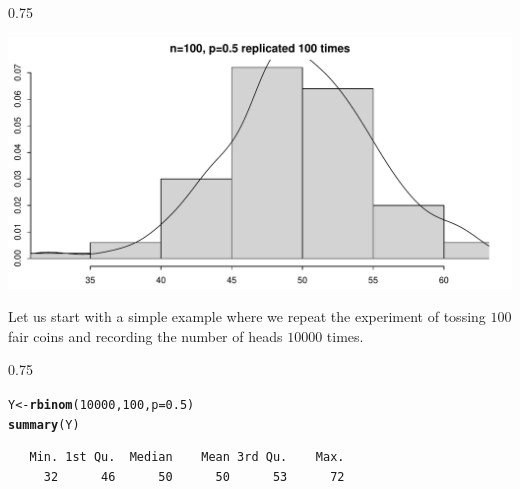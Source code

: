 \documentclass{beamer}\usepackage[]{graphicx}\usepackage[]{color}
\makeatletter
\newcommand{\hlnum}[1]{\textcolor[rgb]{0.2,0.2,0.2}{#1}}%
\newcommand{\hlstd}[1]{\textcolor[rgb]{0.102,0.102,0.102}{#1}}%
\newcommand{\hlkwb}[1]{\textcolor[rgb]{0.102,0.102,0.102}{#1}}%
\newcommand{\hlkwc}[1]{\textcolor[rgb]{0.2,0.2,0.2}{#1}}%
\newcommand{\hlkwd}[1]{\textcolor[rgb]{0.102,0.102,0.102}{\textbf{#1}}}%
\newenvironment{kframe}{%
 \def\at@end@of@kframe{}%
 \ifinner\ifhmode%
  \def\at@end@of@kframe{\end{minipage}}%
  \begin{minipage}{\columnwidth}%
 \fi\fi%
 \def\FrameCommand##1{\hskip\@totalleftmargin \hskip-\fboxsep
 \colorbox{shadecolor}{##1}\hskip-\fboxsep
     \hskip-\linewidth \hskip-\@totalleftmargin \hskip\columnwidth}%
 \MakeFramed {\advance\hsize-\width
   \@totalleftmargin\z@ \linewidth\hsize
   \@setminipage}}%
 {\par\unskip\endMakeFramed%
 \at@end@of@kframe}
\newenvironment{knitrout}{}{} %
\renewenvironment{knitrout}{\begin{spacing}{0.75}\begin{tiny}}{\end{tiny}\end{spacing}}
\makeatother
\begin{document}
\begin{frame}[fragile]

\begin{knitrout}\small
{}\color{fgcolor}

{\centering \includegraphics[width=0.89\linewidth]{figure/graphics-unnamed-chunk-5-1} 

}



\end{knitrout}

\end{frame}

\begin{frame}[fragile]

Let us start with a simple example where we repeat the experiment of tossing
$100$ fair coins and recording the number of heads $10000$ times.

\begin{knitrout}\small
{}\color{fgcolor}\begin{kframe}
\begin{alltt}
\hlstd{Y} \hlkwb{<-} \hlkwd{rbinom}\hlstd{(}\hlnum{10000}\hlstd{,} \hlnum{100}\hlstd{,} \hlkwc{p}\hlstd{=}\hlnum{0.5}\hlstd{)}
\hlkwd{summary}\hlstd{(Y)}
\end{alltt}
\begin{verbatim}
   Min. 1st Qu.  Median    Mean 3rd Qu.    Max. 
     32      46      50      50      53      72 
\end{verbatim}
\end{kframe}
\end{knitrout}

\end{frame}
\end{document}
